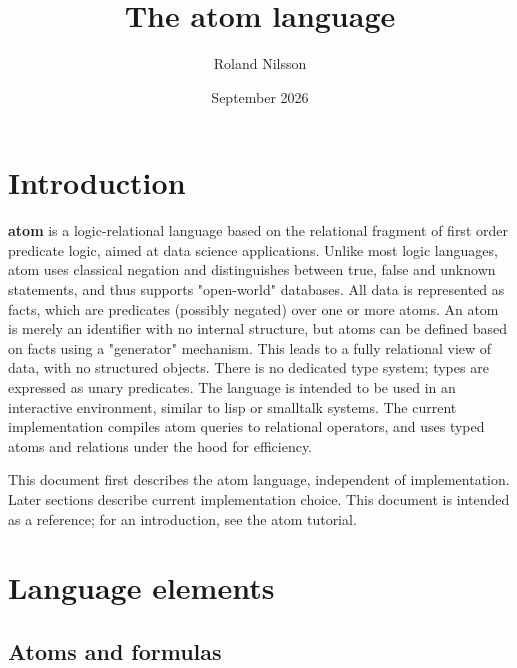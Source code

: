 \documentclass{article}
\title{The atom language}
\author{Roland Nilsson}
\date{September 2026}
\theoremstyle{definition}
\begin{document}
\maketitle


\section{Introduction}

\textbf{atom} is a logic-relational language based on the relational fragment of first order predicate logic, aimed at data science applications. Unlike most logic languages, atom uses classical negation and distinguishes between true, false and unknown statements, and thus supports "open-world" databases. All data is represented as facts, which are predicates (possibly negated) over one or more atoms. An atom is merely an identifier with no internal structure, but atoms can be defined based on facts using a "generator" mechanism. This leads to a fully relational view of data, with no structured objects. There is no dedicated type system; types are expressed as unary predicates. The language is intended to be used in an interactive environment, similar to lisp or smalltalk systems. The current implementation compiles atom queries to relational operators, and uses typed atoms and relations under the hood for efficiency.

This document first describes the atom language, independent of implementation. Later sections describe current implementation choice. This document is intended as a reference; for an introduction, see the atom tutorial.

\section{Language elements}

\subsection{Atoms and formulas}
\end{document}
